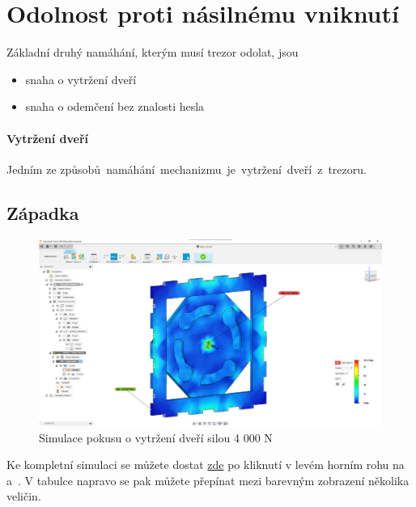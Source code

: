 \newpage

\section{Odolnost proti násilnému vniknutí}
Základní druhý namáhání, kterým musí trezor odolat, jsou

\begin{itemize}
    \item snaha o vytržení dveří 
    \item snaha o odemčení bez znalosti hesla
\end{itemize}

\paragraph{Vytržení dveří}
Jedním ze způsobů~namáhání~mechanizmu~je~vytržení~dveří~z~trezoru.

\subsection{Západka}

\begin{figure}[htbp]
    \centering
    \includegraphics[width=\textwidth]{kapitoly/obrazky/M3/simulace/odolnost_proti_vytrzeni_4kN.png}
    \caption{Simulace pokusu o vytržení dveří silou 4 000 N}
    \label{fig:M3-simulace-vytrzeni}
\end{figure}
Ke kompletní simulaci se můžete dostat \href{https://myhub.autodesk360.com/ue2d7aa41/g/shares/SH56a43QTfd62c1cd96843f1e03a0eb48053?viewState=NoIgbgDAdAjCA0IDeAdEAXAngBwKZoC40BlASwFsBXAGwEN1SB7AOzXjVoGdPd1C0ARjABsATlEQItALQBjcbmkAWCMIjSBuWgA5lAM22ilAVgAmMAOyy9\%2BBGkYCAVrlnoAkqcIBmAL4gAukA}{zde}
\parencite{simulase_mechnické} po kliknutí v levém horním rohu na  a~. V tabulce napravo se pak můžete přepínat mezi barevným zobrazení několika veličin.


